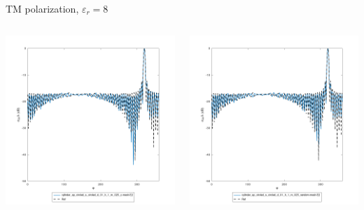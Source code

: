 \begin{frame}{TM polarization, $\varepsilon_r=8$}
\begin{columns}

\includegraphics[width=\linewidth]{results/FF/cylD_01_H_1_M_025_Z/epr8_TM_norm.png}


\includegraphics[width=\linewidth]{results/FF/cylD_01_H_1_M_025_RANDOM/epr8_TM_norm.png}

\end{columns}



\end{frame}



